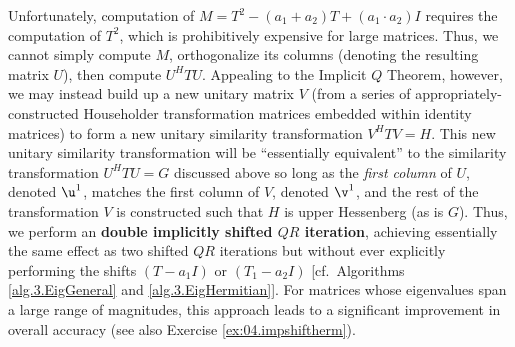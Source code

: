 Unfortunately, computation of $M=T^2 - (a_1+a_2) T + (a_1\cdot a_2) I$ requires the computation of $T^2$, which is prohibitively expensive for large matrices.  Thus, we cannot simply
compute $M$, orthogonalize its columns (denoting the resulting matrix $U$), then compute $U^H T U$.  Appealing to the Implicit $Q$ Theorem, however, we may instead build up a new unitary
matrix $V$ (from a series of appropriately-constructed Householder transformation matrices embedded within identity matrices) to form a new unitary similarity transformation $V^H T V=H$.
This new unitary similarity transformation will be ``essentially equivalent'' to the similarity transformation $U^H T U =G$ discussed above so long as the {\it first column} of $U$, denoted $\u^1$, matches the first column of $V$, denoted $\v^1$,
and the rest of the transformation $V$ is constructed such that $H$ is upper Hessenberg (as is $G$).  Thus, we perform an {\bf double implicitly shifted $QR$ iteration},
achieving essentially the same effect as two shifted $QR$ iterations but without ever explicitly performing the shifts $(T-a_1 I)$ or $(T_1-a_2 I)$ [cf.~Algorithms \ref{alg.3.EigGeneral} and
\ref{alg.3.EigHermitian}].  For matrices whose eigenvalues span a large range of magnitudes, this approach leads to a significant improvement in overall accuracy (see also Exercise
\ref{ex:04.impshiftherm}).

